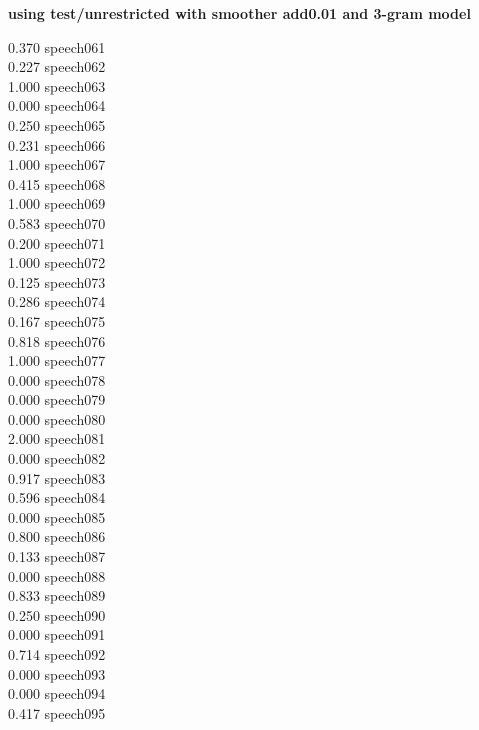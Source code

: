 \documentclass[10pt]{article}
\begin{document}
\begin{enumerate}
\begin{enumerate}
            \textbf{using test/unrestricted with smoother add0.01 and 3-gram model}
            \begin{multicols}{5}
            0.370 speech061\\
            0.227 speech062\\
            1.000 speech063\\
            0.000 speech064\\
            0.250 speech065\\
            0.231 speech066\\
            1.000 speech067\\
            0.415 speech068\\
            1.000 speech069\\
            0.583 speech070\\
            0.200 speech071\\
            1.000 speech072\\
            0.125 speech073\\
            0.286 speech074\\
            0.167 speech075\\
            0.818 speech076\\
            1.000 speech077\\
            0.000 speech078\\
            0.000 speech079\\
            0.000 speech080\\
            2.000 speech081\\
            0.000 speech082\\
            0.917 speech083\\
            0.596 speech084\\
            0.000 speech085\\
            0.800 speech086\\
            0.133 speech087\\
            0.000 speech088\\
            0.833 speech089\\
            0.250 speech090\\
            0.000 speech091\\
            0.714 speech092\\
            0.000 speech093\\
            0.000 speech094\\
            0.417 speech095\\

\end{multicols}
\end{enumerate}
\end{enumerate}
\end{document}
